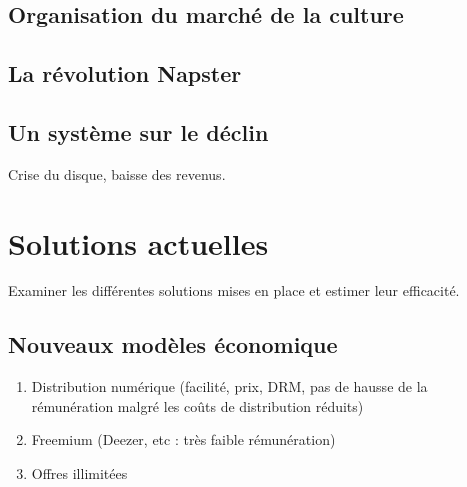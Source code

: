 \documentclass[a4paper]{report}
\begin{document}
	\section{Organisation du marché de la culture}


	\section{La révolution Napster}


	\section{Un système sur le déclin}
	Crise du disque, baisse des revenus.





	\chapter{Solutions actuelles}
	Examiner les différentes solutions mises en place et estimer leur efficacité.

	\section{Nouveaux modèles économique}
	\begin{enumerate}
		\item Distribution numérique (facilité, prix, DRM, pas de hausse de la rémunération malgré les coûts de distribution réduits)
		\item Freemium (Deezer, etc : très faible rémunération)
		\item Offres illimitées
	\end{enumerate}
\end{document}
